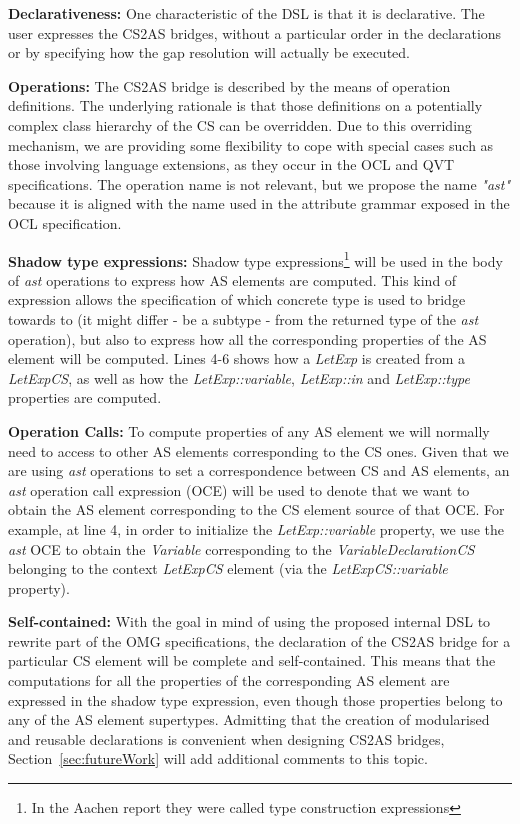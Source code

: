 \documentclass{llncs}
\begin{document}
\textbf{Declarativeness:} One characteristic of the DSL is that it is declarative. The user expresses the CS2AS bridges, without a particular order in the declarations or by specifying how the gap resolution will actually be executed.

\textbf{Operations:} The CS2AS bridge is described by the means of operation definitions. The underlying rationale is that those definitions on a potentially complex class hierarchy of the CS can be overridden. Due to this overriding mechanism, we are providing some flexibility to cope with special cases such as those involving language extensions, as they occur in the OCL and QVT specifications. The operation name is not relevant, but we propose the name \emph{"ast"} because it is aligned with the name used in the attribute grammar exposed in the OCL specification.

\textbf{Shadow type expressions:} Shadow type expressions\footnote{In the Aachen report \cite{brucker2013aachenReport} they were called type construction expressions} will be used in the body of \emph{ast} operations to express how AS elements are computed. This kind of expression allows the specification of which concrete type is used to bridge towards to (it might differ - be a subtype - from the returned type of the \emph{ast} operation), but also to express how all the corresponding properties of the AS element will be computed. Lines 4-6 shows how a \emph{LetExp} is created from a \emph{LetExpCS}, as well as how the \emph{LetExp::variable}, \emph{LetExp::in} and \emph{LetExp::type} properties are computed.

\textbf{Operation Calls:} To compute properties of any AS element we will normally need to access to other AS elements corresponding to the CS ones. Given that we are using \emph{ast} operations to set a correspondence between CS and AS elements, an \emph{ast} operation call expression (OCE) will be used to denote that we want to obtain the AS element corresponding to the CS element source of that OCE. For example, at line 4, in order to initialize the \emph{LetExp::variable} property, we use the \emph{ast} OCE to obtain the \emph{Variable} corresponding to the \emph{VariableDeclarationCS} belonging to the context \emph{LetExpCS} element (via the \emph{LetExpCS::variable} property).

\textbf{Self-contained:} With the goal in mind of using the proposed internal DSL to rewrite part of the OMG specifications, the declaration of the CS2AS bridge for a particular CS element will be complete and self-contained. This means that the computations for all the properties of the corresponding AS element are expressed in the shadow type expression, even though those properties belong to any of the AS element supertypes. Admitting that the creation of modularised and reusable declarations is convenient when designing CS2AS bridges, Section~\ref{sec:futureWork} will add additional comments to this topic.
\end{document}
